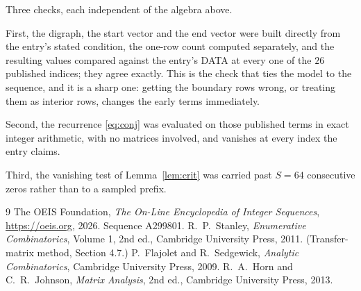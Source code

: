 \documentclass[11pt,a4paper]{article}
\theoremstyle{plain}
\theoremstyle{definition}
\begin{document}
Three checks, each independent of the algebra above.

First, the digraph, the start vector and the end vector were built directly from the
entry's stated condition, the one-row count computed separately, and the resulting values
compared against the entry's DATA at every one of the $26$ published indices; they
agree exactly. This is the check that ties the model to the sequence, and it is a sharp one:
getting the boundary rows wrong, or treating them as interior rows, changes the early terms
immediately.

Second, the recurrence \eqref{eq:conj} was evaluated on those published terms in exact
integer arithmetic, with no matrices involved, and vanishes at every index the entry claims.

Third, the vanishing test of Lemma~\ref{lem:crit} was carried past $S=64$ consecutive
zeros rather than to a sampled prefix.

\begin{thebibliography}{9}
 The OEIS Foundation, \emph{The On-Line Encyclopedia of Integer
Sequences}, \url{https://oeis.org}, 2026. Sequence A299801.
 R.~P.~Stanley, \emph{Enumerative Combinatorics}, Volume 1, 2nd ed.,
Cambridge University Press, 2011. (Transfer-matrix method, Section 4.7.)
 P.~Flajolet and R.~Sedgewick, \emph{Analytic Combinatorics}, Cambridge
University Press, 2009.
 R.~A.~Horn and C.~R.~Johnson, \emph{Matrix Analysis}, 2nd ed., Cambridge
University Press, 2013.
\end{thebibliography}
\end{document}
